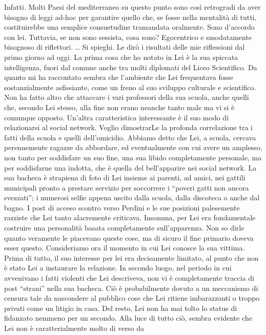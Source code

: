 \documentclass[a4paper,12pt]{article}
\newcommand{\Walter}{\speak{W}}
\newcommand{\Pollazzi}{\speak{P}}
\begin{document}
\begin{dialogue}
\Pollazzi Infatti. Molti Paesi del mediterraneo su questo punto sono così retrogradi da aver bisogno di leggi ad-hoc per garantire quello che, se fosse nella mentalità di tutti, costituirebbe una semplice consuetudine tramandata oralmente.
\Walter  Sono d’accordo con lei. Tuttavia, se non sono sessista, cosa sono?
\Pollazzi Egocentrico e smodatamente bisognoso di riflettori.
\Walter  … Si spieghi.
\Pollazzi Le dirò i risultati delle mie riflessioni dal primo giorno ad oggi.
La prima cosa che ho notato in Lei è la sua spiccata intelligenza, fuori dal
comune anche tra molti diplomati del Liceo Scientifico. Da quanto mi ha
raccontato sembra che l’ambiente che Lei frequentava fosse sostanzialmente
asfissiante, come un freno al suo sviluppo culturale e scientifico. Non ha fatto
altro che attaccare i vari professori della sua scuola, anche quelli che,
secondo Lei stesso, alla fine non erano neanche tanto male ma vi si è comunque
opposto. Un’altra caratteristica interessante è il suo modo di relazionarsi al
social network. Voglio dimostrarLe la profonda correlazione tra i fatti della
scuola e quelli dell’omicidio. Abbiamo detto che Lei, a scuola, cercava
perennemente ragazze da abbordare, ed eventualmente con cui avere un amplesso,
non tanto per soddisfare un suo fine, una sua libido completamente personale, ma
per soddisfarne una indotta, che è quella del bell’apparire nei social network.
La sua bacheca è strapiena di foto di Lei insieme ai parenti, ad amici, nei
gattili municipali pronto a prestare servizio per soccorrere i “poveri gatti non
ancora svezzati”; i numerosi selfie appena uscito dalla scuola, dalla discoteca
o anche dal bagno. I post di acceso scontro verso Perdini e le sue posizioni
palesemente razziste che Lei tanto alacremente criticava. Insomma, per Lei era
fondamentale costruire una personalità basata completamente sull’apparenza. Non
so dirle quanto veramente le piacevano queste cose, ma di sicuro il fine
primario doveva esser questo. Consideriamo ora il momento in cui Lei conosce la
sua vittima. Prima di tutto, il suo interesse per lei era decisamente limitato,
al punto che non è stato Lei a instaurare la relazione. In secondo luogo, nel
periodo in cui avvenivano i fatti violenti che Lei descriveva, non vi è
completamente traccia di post “strani” nella sua bacheca. Ciò è probabilmente
dovuto a un meccanismo di censura tale da nascondere al pubblico cose che Lei
ritiene imbarazzanti o troppo privati come un litigio in casa. Del resto, Lei
non ha mai tolto lo status di fidanzato nemmeno per un secondo. Alla luce di
tutto ciò, sembra evidente che Lei non è caratterialmente molto di verso da

\end{dialogue}
\end{document}
